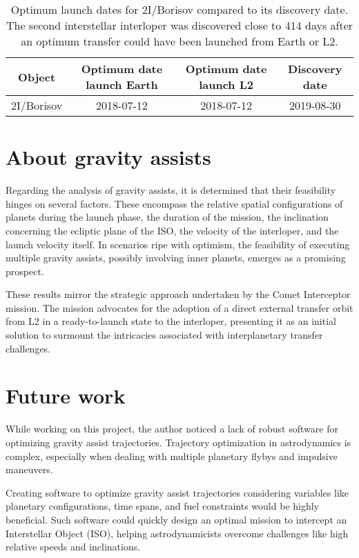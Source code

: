 \vspace{1cm}
\begin{table}[H]
    \centering
    \begin{tabular}{|c|c|c|c|}
    \hline
    Object       & Optimum date launch Earth & Optimum date launch L2 & Discovery date \\
    \hline
    2I/Borisov   & 2018-07-12                 & 2018-07-12             & 2019-08-30     \\
    \hline
    \end{tabular}
    \caption[Optimum launch dates for 2I/Borisov compared to discovery its
        discovery date]{Optimum launch dates for
        2I/Borisov compared to its discovery date. The second interstellar
        interloper was discovered close to 414 days after an optimum transfer
        could have been launched from Earth or L2.}
    \label{tab:optimum-launch-dates-borisov}
\end{table}

\section{About gravity assists}

Regarding the analysis of gravity assists, it is determined that their
feasibility hinges on several factors. These encompass the relative spatial
configurations of planets during the launch phase, the duration of the mission,
the inclination concerning the ecliptic plane of the ISO, the velocity of the
interloper, and the launch velocity itself. In scenarios ripe with optimism, the
feasibility of executing multiple gravity assists, possibly involving inner
planets, emerges as a promising prospect.

These results mirror the strategic approach undertaken by the Comet Interceptor
mission. The mission advocates for the adoption of a direct external transfer
orbit from L2 in a ready-to-launch state to the interloper, presenting it as an
initial solution to surmount the intricacies associated with interplanetary
transfer challenges.

\section{Future work}

While working on this project, the author noticed a lack of robust software for
optimizing gravity assist trajectories. Trajectory optimization in astrodynamics
is complex, especially when dealing with multiple planetary flybys and impulsive
maneuvers.

Creating software to optimize gravity assist trajectories considering variables
like planetary configurations, time spans, and fuel constraints would be highly
beneficial. Such software could quickly design an optimal mission to intercept an
Interstellar Object (ISO), helping astrodynamicists overcome challenges like
high relative speeds and inclinations.
